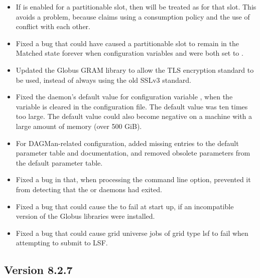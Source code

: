 \begin{itemize}
\item If  is enabled for a partitionable slot,
then  will be treated as
 for that slot.
This avoids a problem, because claims using a consumption policy
and the use of  conflict
with each other.

\item Fixed a bug that could have caused a partitionable slot to remain in
the Matched state forever when configuration variables
 and 
were both set to .

\item Updated the Globus GRAM library to allow the TLS encryption standard
to be used, instead of always using the old SSLv3 standard.

\item Fixed the  daemon's default value for configuration 
variable , 
when the variable is cleared in the configuration file.
The default value was ten times too large.
The default value could also become negative on a machine with a large
amount of memory (over 500 GiB).

\item For DAGMan-related configuration,
added missing entries to the default parameter table and documentation,
and removed obsolete parameters from the default parameter table.

\item Fixed a bug in  that, 
when processing the  command line option,
prevented it from detecting that the 
 or  daemons had exited.

\item Fixed a bug that could cause the  to fail at start up,
if an incompatible version of the Globus libraries were installed.

\item Fixed a bug that could cause grid universe jobs of grid type lsf
to fail when attempting to submit to LSF.

\end{itemize}

\subsection*{\label{sec:New-8-2-7}Version 8.2.7}

